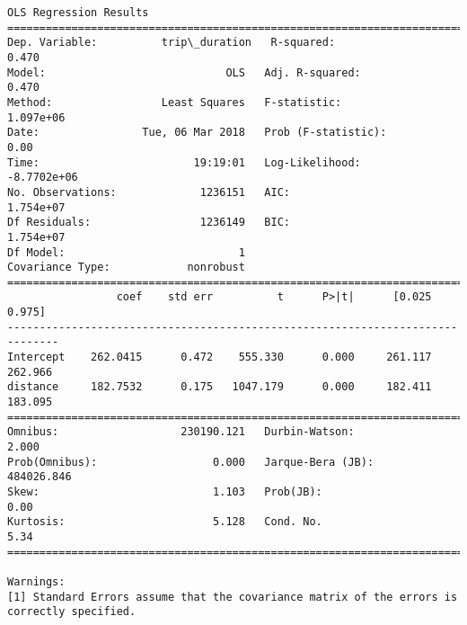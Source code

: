 \documentclass[11pt]{article}
\begin{document}
    \begin{Verbatim}[commandchars=\\\{\}]
                            OLS Regression Results                            
==============================================================================
Dep. Variable:          trip\_duration   R-squared:                       0.470
Model:                            OLS   Adj. R-squared:                  0.470
Method:                 Least Squares   F-statistic:                 1.097e+06
Date:                Tue, 06 Mar 2018   Prob (F-statistic):               0.00
Time:                        19:19:01   Log-Likelihood:            -8.7702e+06
No. Observations:             1236151   AIC:                         1.754e+07
Df Residuals:                 1236149   BIC:                         1.754e+07
Df Model:                           1                                         
Covariance Type:            nonrobust                                         
==============================================================================
                 coef    std err          t      P>|t|      [0.025      0.975]
------------------------------------------------------------------------------
Intercept    262.0415      0.472    555.330      0.000     261.117     262.966
distance     182.7532      0.175   1047.179      0.000     182.411     183.095
==============================================================================
Omnibus:                   230190.121   Durbin-Watson:                   2.000
Prob(Omnibus):                  0.000   Jarque-Bera (JB):           484026.846
Skew:                           1.103   Prob(JB):                         0.00
Kurtosis:                       5.128   Cond. No.                         5.34
==============================================================================

Warnings:
[1] Standard Errors assume that the covariance matrix of the errors is correctly specified.

    \end{Verbatim}
\end{document}
